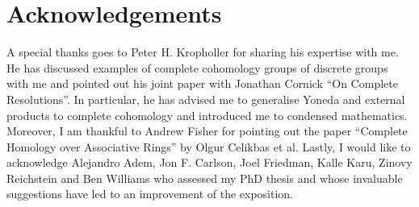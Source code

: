 \documentclass[12pt, a4paper]{article}
\numberwithin{equation}{section}
\theoremstyle{empty}
\theoremstyle{nonumberplain}
\begin{document}
\section*{Acknowledgements}

A special thanks goes to Peter H. Kropholler for sharing his expertise with me. He has discussed examples of complete cohomology groups of discrete groups with me and pointed out his joint paper with Jonathan Cornick ``On Complete Resolutions''. In particular, he has advised me to generalise Yoneda and external products to complete cohomology and introduced me to condensed mathematics. \\

Moreover, I am thankful to Andrew Fisher for pointing out the paper ``Complete Homology over Associative Rings'' by Olgur Celikbas et al. Lastly, I would like to acknowledge Alejandro Adem, Jon F.\! Carlson, Joel Friedman, Kalle Karu, Zinovy Reichstein and Ben Williams who assessed my PhD thesis and whose invaluable suggestions have led to an improvement of the exposition.

\renewcommand{\bibname}{References}
\end{document}
